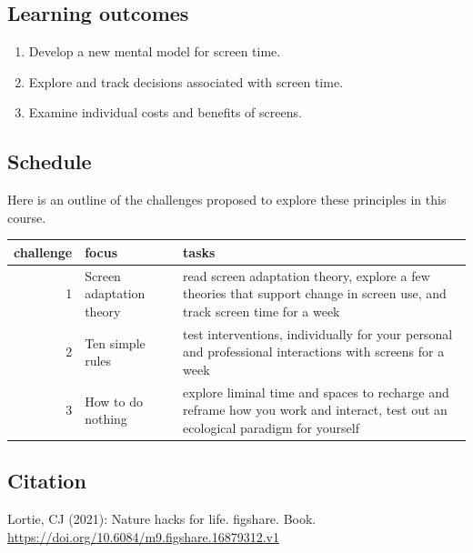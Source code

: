 \documentclass[
]{book}
\providecommand{\tightlist}{%
  \setlength{\itemsep}{0pt}\setlength{\parskip}{0pt}}
\begin{document}
\hypertarget{learning-outcomes}{%
\subsection*{Learning outcomes}\label{learning-outcomes}}

\begin{enumerate}
\def\labelenumi{\arabic{enumi}.}
\tightlist
\item
  Develop a new mental model for screen time.\\
\item
  Explore and track decisions associated with screen time.\\
\item
  Examine individual costs and benefits of screens.
\end{enumerate}

\hypertarget{schedule}{%
\subsection*{Schedule}\label{schedule}}

Here is an outline of the challenges proposed to explore these principles in this course.

\begin{tabular}{rll}
\toprule
challenge & focus & tasks\\
\midrule
1 & Screen adaptation theory & read screen adaptation theory, explore a few theories that support change in screen use, and track screen time for a week\\
2 & Ten simple rules & test interventions, individually for your personal and professional interactions with screens for a week\\
3 & How to do nothing & explore liminal time and spaces to recharge and reframe how you work and interact, test out an ecological paradigm for yourself\\
\bottomrule
\end{tabular}

\hypertarget{citation}{%
\subsection*{Citation}\label{citation}}

Lortie, CJ (2021): Nature hacks for life. figshare. Book. \url{https://doi.org/10.6084/m9.figshare.16879312.v1}
\end{document}
